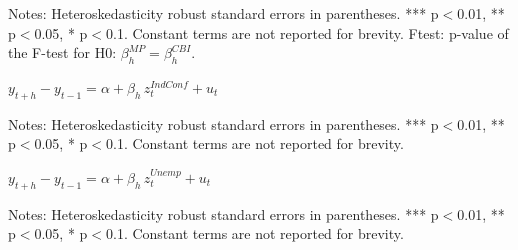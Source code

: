 \documentclass[a4paper,12pt]{article}
\newcommand{\pathTables}{tables/}
\begin{document}
\begin{table}[!htbp]\addtocounter{table}{-1}\small
\begin{center}
\caption{Continued}
\end{center}
Notes: Heteroskedasticity robust standard errors in parentheses. *** p$<$0.01, ** p$<$0.05, * p$<$0.1.
Constant terms are not reported for brevity.
Ftest: p-value of the F-test for H0: $\beta^{MP}_h=\beta^{CBI}_h$.
\end{table}


\begin{table}[!htbp]
\begin{center}
\caption{The effect of European industrial confidence surprises on stock sub-indices}\label{tab: lp z ea bcs confind stocks}
$y^{}_{t+h}-y^{}_{t-1} = \alpha + \beta_h\, z^{IndConf}_t + u_t$
\small
{}
\end{center}\footnotesize
Notes: Heteroskedasticity robust standard errors in parentheses. *** p$<$0.01, ** p$<$0.05, * p$<$0.1.
Constant terms are not reported for brevity.
\end{table}

\begin{table}[!htbp]
\begin{center}
\caption{The effect of euro area unemployment rate surprises on stock sub-indices}\label{tab: lp z ea unemp stocks}
$y^{}_{t+h}-y^{}_{t-1} = \alpha + \beta_h\, z^{Unemp}_t + u_t$
\small
{}
\end{center}\footnotesize
Notes: Heteroskedasticity robust standard errors in parentheses. *** p$<$0.01, ** p$<$0.05, * p$<$0.1.
Constant terms are not reported for brevity.
\end{table}
\end{document}
